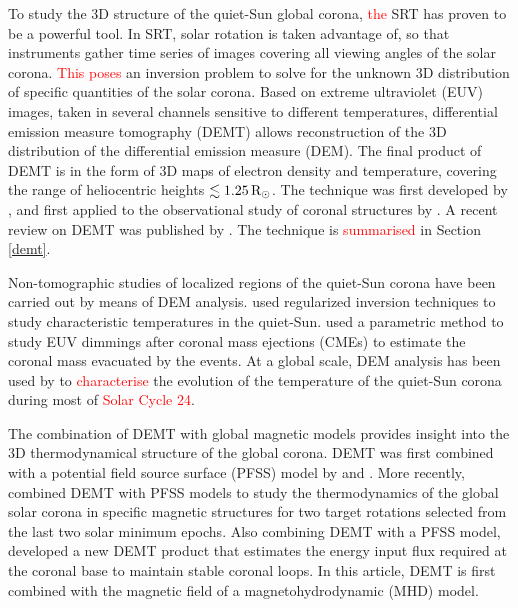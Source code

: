 \documentclass[namedreferences]{solarphysics}
\def\edit#1{\textcolor{Red}{#1}}
\newcommand{\mrsun}{{\rm R_\odot}}
\begin{document}
\begin{article}
To study the {3D structure of the quiet-Sun global corona,} \edit{the} SRT has proven to be a powerful tool. {In SRT, solar rotation is taken advantage of, so that instruments gather time series of images covering all viewing angles of the solar corona. \edit{This poses} an inversion problem to solve for the unknown 3D distribution of specific quantities of the solar corona. Based on extreme ultraviolet (EUV) images, taken in several channels sensitive to different temperatures, differential emission measure tomography (DEMT) allows reconstruction of the 3D distribution of the differential emission measure (DEM). The final product of DEMT is in the form of 3D maps of electron density and temperature, covering the range of heliocentric heights $\lesssim 1.25\,\mrsun$.} The technique was first developed by \citet{frazin_2009}, and first applied to the observational study of coronal structures by \citet{vasquez_2009}. {A recent review on DEMT was published by \citet{vasquez_2016}. The technique is \edit{summarised} in Section \ref{demt}.} 

{Non-tomographic studies of localized regions of the quiet-Sun corona have been carried out by means of DEM analysis. \citet{mackovjak_2014} used regularized inversion techniques to study characteristic temperatures in the quiet-Sun. \citet{lopez_2019} used a parametric method to study EUV dimmings after coronal mass ejections (CMEs) to estimate the coronal mass evacuated by the events. At a global scale, DEM analysis has been used by \citet{morgan_2017} to \edit{characterise} the evolution of the temperature of the quiet-Sun corona during most of \edit{Solar Cycle 24}.}

{The combination of DEMT with global magnetic models provides insight} into the 3D thermodynamical structure of the global corona. {DEMT was first combined with a potential field source surface (PFSS) model by \citet{huang_2012} and \citet{nuevo_2013}. More recently,} \citet{lloveras_2017} combined DEMT with PFSS {models to study the thermodynamics of the global solar corona in specific magnetic structures for two target rotations selected from the last two solar minimum epochs. Also combining DEMT with a PFSS model,} \citet{maccormack_2017} developed a new DEMT product that estimates the energy input flux {required at the coronal base to maintain stable coronal loops}. In this article, {DEMT is first combined with the magnetic field of a magnetohydrodynamic (MHD) model.}


\end{article}
\end{document}
